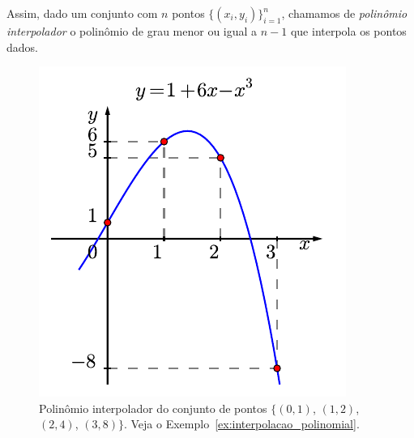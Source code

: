 Assim, dado um conjunto com $n$ pontos $\{(x_i,y_i)\}_{i=1}^{n}$, chamamos de \emph{polinômio interpolador} o polinômio de grau menor ou igual a $n-1$ que interpola os pontos dados.


\begin{figure}
  \centering
  \includegraphics{./cap_interp/pics/ex_interpolacao_polinomial/ex_interpolacao_polinomial}
  \caption{Polinômio interpolador do conjunto de pontos $\{(0, 1)$, $(1, 2)$, $(2, 4)$, $(3, 8)\}$. Veja o Exemplo~\ref{ex:interpolacao_polinomial}.}\label{fig:ex_interpolacao_polinomial}
\end{figure}

